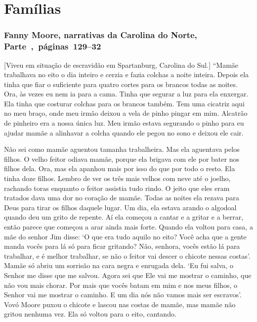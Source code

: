 \chapter{Famílias}

\subsection{Fanny Moore, narrativas da Carolina do Norte, Parte~,~páginas~129--32}
\label{ref194}

{[}Viveu em situação de escravidão em Spartanburg, Carolina do Sul.{]} ``Mamãe trabalhava no eito o dia inteiro e cerzia e fazia colchas a
noite inteira. Depois ela tinha que fiar o suficiente para quatro cortes
para os brancos todas as noites. Ora, às vezes eu nem ia para a cama.
Tinha que segurar a luz para ela enxergar. Ela tinha que costurar
colchas para os brancos também. Tem uma cicatriz aqui no meu braço, onde
meu irmão deixou a vela de pinho pingar em mim. Alcatrão de pinheiro era
a nossa única luz. Meu irmão estava segurando o pinho para eu ajudar
mamãe a alinhavar a colcha quando ele pegou no sono e deixou ele cair.

Não sei como mamãe aguentou tamanha trabalheira. Mas ela aguentava pelos
filhos. O velho feitor odiava mamãe, porque ela brigava com ele por
bater nos filhos dela. Ora, mas ela apanhou mais por isso do que por
todo o resto. Ela tinha doze filhos. Lembro de ver os três mais velhos
com neve até o joelho, rachando toras enquanto o feitor assistia tudo
rindo. O jeito que eles eram tratados dava uma dor no coração de mamãe.
Todas as noites ela rezava para Deus para tirar os filhos daquele lugar.
Um dia, ela estava arando o algodoal quando deu um grito de repente. Aí
ela começou a cantar e a gritar e a berrar, então parece que começou a
arar ainda mais forte. Quando ela voltou para casa, a mãe do senhor Jim
disse: `O que era tudo aquilo no eito? Você acha que a gente manda vocês
para lá só para ficar gritando? Não, senhora, vocês estão lá para
trabalhar, e é melhor trabalhar, se não o feitor vai descer o chicote
nessas costas'. Mamãe só abriu um sorrisão na cara negra e enrugada
dela. `Eu fui salva, o Senhor me disse que me salvou. Agora sei que Ele
vai me mostrar o caminho, que não vou mais chorar. Por mais que vocês
batam em mim e nos meus filhos, o Senhor vai me mostrar o caminho. E um
dia nós não vamos mais ser escravos'. Vovó Moore puxou o chicote e
lascou nas costas de mamãe, mas mamãe não gritou nenhuma vez. Ela só
voltou para o eito, cantando.

